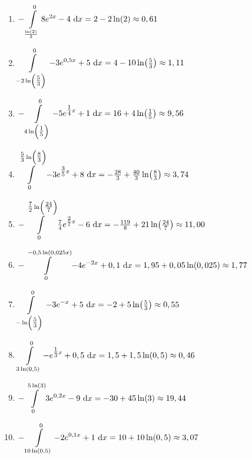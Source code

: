 \begin{Answer}[ref=flaecheRechnA2]
	\begin{enumerate}[label=\alph*)]
		\item \(\displaystyle-\int\limits_{\frac{\ln(2)}{2}}^{0} 8e^{2x}-4 \ \text{d} x=2-2\ln(2)\approx 0,61\)
		\item \(\displaystyle\int\limits_{-2\ln\left(\tfrac{5}{3}\right)}^{0} -3e^{0,5x}+5 \td x=4-10\ln\left(\tfrac{5}{3}\right)\approx1,11\)
		\item \(\displaystyle-\int\limits_{4\ln\left(\tfrac{1}{5}\right)}^{0} -5e^{\tfrac{1}{4}x}+1 \td x=16+4\ln\left(\tfrac{1}{5}\right)\approx 9,56\)
		\item \(\displaystyle\int\limits_{0}^{\tfrac{5}{3}\ln\left(\tfrac{8}{3}\right)} -3e^{\tfrac{3}{5}x}+8 \td x=-\tfrac{28}{3}+\tfrac{40}{3}\ln\left(\tfrac{8}{3}\right)\approx 3,74\)
		\item \(\displaystyle-\int\limits_{0}^{\tfrac{7}{2}\ln\left(\tfrac{24}{7}\right)} \tfrac{7}{4}e^{\tfrac{2}{7}x}-6 \td x=-\tfrac{119}{8}+21\ln\left(\tfrac{24}{7}\right)\approx 11,00\)
		\item \(\displaystyle-\int\limits_{0}^{-0,5\ln(0,025x)} -4e^{-2x}+0,1 \ \text{d} x= 1,95+0,05\ln(0,025)\approx 1,77\)
		\item \(\displaystyle\int\limits_{-\ln\left(\tfrac{5}{3}\right)}^{0} -3e^{-x}+5 \td x=-2+5\ln\left(\tfrac{5}{3}\right)\approx 0,55\)
		\item \(\displaystyle\int\limits_{3\ln(0,5)}^{0} -e^{\tfrac{1}{3}x}+0,5 \ \text{d} x=1,5+1,5\ln(0,5)\approx 0,46\)
		\item \(\displaystyle-\int\limits_{0}^{5\ln(3)} 3e^{0,2x}-9 \ \text{d} x=-30+45\ln(3)\approx 19,44\)
		\item \(\displaystyle-\int\limits_{10\ln(0,5)}^{0} -2e^{0,1x}+1 \ \text{d} x=10+10\ln(0,5)\approx 3,07\)
	\end{enumerate}
\end{Answer}